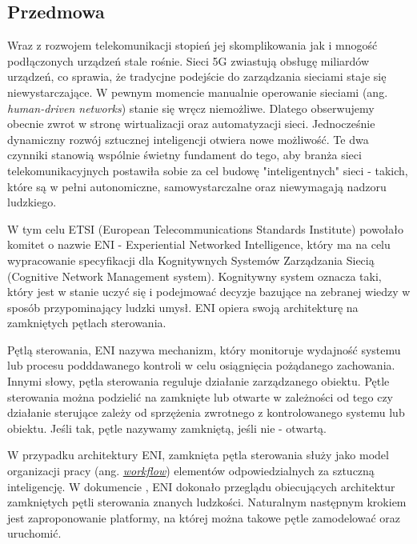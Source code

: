 \subsection{Przedmowa}

Wraz z rozwojem telekomunikacji stopień jej skomplikowania jak i mnogość podłączonych urządzeń stale rośnie. Sieci 5G zwiastują obsługę miliardów urządzeń, co sprawia, że tradycjne podejście do zarządzania sieciami staje się niewystarczające. W pewnym momencie manualnie operowanie sieciami (ang. \textit{human-driven networks}) stanie się wręcz niemożliwe. Dlatego obserwujemy obecnie zwrot w stronę wirtualizacji oraz automatyzacji sieci. Jednocześnie dynamiczny rozwój sztucznej inteligencji otwiera nowe możliwość. Te dwa czynniki stanowią wspólnie świetny fundament do tego, aby branża sieci telekomunikacyjnych postawiła sobie za cel budowę "inteligentnych" sieci - takich, które są w pełni autonomiczne, samowystarczalne oraz niewymagają nadzoru ludzkiego.

W tym celu ETSI (European Telecommunications Standards Institute) powołało komitet o nazwie ENI - Experiential Networked Intelligence, który ma na celu wypracowanie specyfikacji dla Kognitywnych Systemów Zarządzania Siecią (Cognitive Network Management system). Kognitywny system oznacza taki, który jest w stanie uczyć się i podejmować decyzje bazujące na zebranej wiedzy w sposób przypominający ludzki umysł. ENI opiera swoją architekturę na zamkniętych pętlach sterowania.

Pętlą sterowania, ENI nazywa mechanizm, który monitoruje wydajność systemu lub procesu podddawanego kontroli w celu osiągnięcia pożądanego zachowania. Innymi słowy, pętla sterowania reguluje działanie zarządzanego obiektu. Pętle sterowania można podzielić na zamknięte lub otwarte w zależności od tego czy działanie sterujące zależy od sprzężenia zwrotnego z kontrolowanego systemu lub obiektu. Jeśli tak, pętle nazywamy zamkniętą, jeśli nie - otwartą. 

W przypadku architektury ENI, zamknięta pętla sterowania służy jako model organizacji pracy (ang. \hyperref[def:workflow]{\textit{workflow}}) elementów odpowiedzialnych za sztuczną inteligencję. W dokumencie \cite*{enioverview}, ENI dokonało przeglądu obiecujących architektur zamkniętych pętli sterowania znanych ludzkości. Naturalnym następnym krokiem jest zaproponowanie platformy, na której można takowe pętle zamodelować oraz uruchomić. 

